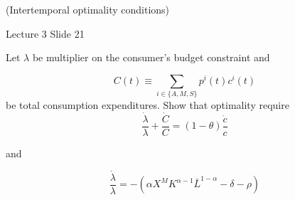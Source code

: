(Intertemporal optimality conditions)

Lecture 3 Slide 21

Let $\lambda$ be multiplier on the consumer's budget constraint and

$$
C(t) \equiv \sum_{i \in\{A, M, S\}} p^i(t) c^i(t)
$$
be total consumption expenditures. Show that optimality require
$$
\frac{\dot{\lambda}}{\lambda}+\frac{\dot{C}}{C}=(1-\theta) \frac{\dot{c}}{c}
$$

and

$$
\frac{\dot{\lambda}}{\lambda}=-\left(\alpha X^M K^{\alpha-1} \bar{L}^{1-\alpha}-\delta-\rho\right)
$$